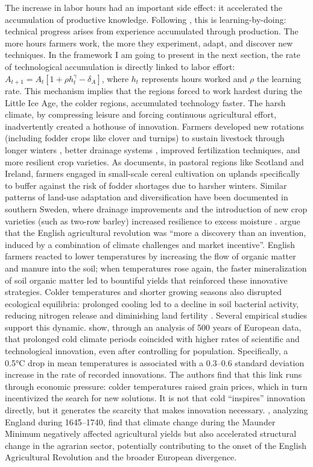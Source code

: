 \documentclass[11pt,a4paper]{article}
\begin{document}
The increase in labor hours had an important side effect: it accelerated the accumulation of productive knowledge.
Following \textcite{Arrow1962}, this is learning-by-doing: technical progress arises from experience accumulated through production. The more hours farmers work, the more they experiment, adapt, and discover new techniques. In the framework I am going to present in the next section, the rate of technological accumulation is directly linked to labor effort: \(A_{t+1} = A_t[1 + \rho h_t^\gamma - \delta_A]\), where \(h_t\) represents hours worked and \(\rho\) the learning rate.
This mechanism implies that the regions forced to work hardest during the Little Ice Age, the colder regions, accumulated technology faster. The harsh climate, by compressing leisure and forcing continuous agricultural effort, inadvertently created a hothouse of innovation. Farmers developed new rotations (including fodder crops like clover and turnips) to sustain livestock through longer winters \parencite{Tello2017}, better drainage systems \parencite{Skoglund2023}, improved fertilization techniques, and more resilient crop varieties. As \textcite{Costello2023} documents, in pastoral regions like Scotland and Ireland, farmers engaged in small-scale cereal cultivation on uplands specifically to buffer against the risk of fodder shortages due to harsher winters. Similar patterns of land-use adaptation and diversification have been documented in southern Sweden, where drainage improvements and the introduction of new crop varieties (such as two-row barley) increased resilience to excess moisture \parencite{Skoglund2023}.
\textcite{Tello2017} argue that the English agricultural revolution was ``more a discovery than an invention, induced by a combination of climate challenges and market incentive''. English farmers reacted to lower temperatures by increasing the flow of organic matter and manure into the soil; when temperatures rose again, the faster mineralization of soil organic matter led to bountiful yields that reinforced these innovative strategies. Colder temperatures and shorter growing seasons also disrupted ecological equilibria: prolonged cooling led to a decline in soil bacterial activity, reducing nitrogen release and diminishing land fertility \parencite{Tello2017}.
Several empirical studies support this dynamic. \textcite{DeDreu2018} show, through an analysis of 500 years of European data, that prolonged cold climate periods coincided with higher rates of scientific and technological innovation, even after controlling for population. Specifically, a 0.5°C drop in mean temperatures is associated with a 0.3--0.6 standard deviation increase in the rate of recorded innovations. The authors find that this link runs through economic pressure: colder temperatures raised grain prices, which in turn incentivized the search for new solutions. It is not that cold ``inspires'' innovation directly, but it generates the scarcity that makes innovation necessary. \textcite{MartinezGonzalez2020}, analyzing England during 1645--1740, find that climate change during the Maunder Minimum negatively affected agricultural yields but also accelerated structural change in the agrarian sector, potentially contributing to the onset of the English Agricultural Revolution and the broader European divergence.
\end{document}
